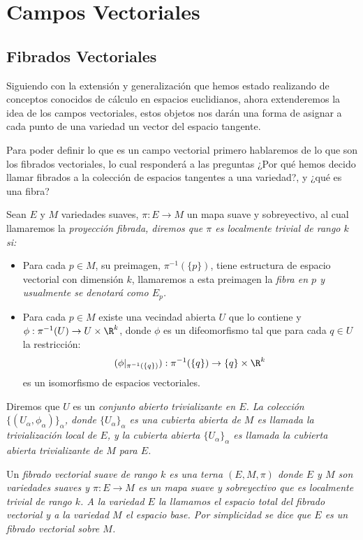 \section{Campos Vectoriales}\label{Sección: Campos Vectoriales}
\subsection{Fibrados Vectoriales}\label{Subsección: Fibrados Vectoriales}
Siguiendo con la extensión y generalización que hemos estado realizando de conceptos conocidos de cálculo en espacios euclidianos, ahora extenderemos la idea de los campos vectoriales, estos objetos nos darán una forma de asignar a cada punto de una variedad un vector del espacio tangente.

Para poder definir lo que es un campo vectorial primero hablaremos de lo que son los fibrados vectoriales, lo cual responderá a las preguntas ¿Por qué hemos decido llamar fibrados a la colección de espacios tangentes a una variedad?, y ¿qué es una fibra?

\begin{definition}
	Sean $E$ y $M$ variedades suaves, $\pi: E \to M$ un mapa suave y sobreyectivo, al cual llamaremos la \it{proyección fibrada}, diremos que $\pi$ es \it{localmente trivial de rango $k$} si:

	\begin{itemize}
		\item Para cada $p \in M$, su preimagen, $\pi^{-1}(\{p\})$, tiene estructura de espacio vectorial con dimensión $k$, llamaremos a esta preimagen la \it{fibra en $p$} y usualmente se denotará como $E_p$.

		\item Para cada $p \in M$ existe una vecindad abierta $U$ que lo contiene y $\phi: \pi^{-1}(U) \to U \times \R^{k}$, donde $\phi$ es un difeomorfismo tal que para cada $q \in U$ la restricción:
      \[ (\phi|_{\pi^{-1}(\{q\})}): \pi^{-1}(\{q\}) \to \{q\} \times \R^{k} \]
		      es un isomorfismo de espacios vectoriales.
	\end{itemize}

	Diremos que $U$ es un \it{conjunto abierto trivializante} en $E$. La colección $\{(U_\alpha, \phi_\alpha)\}_{\alpha}$, donde $\{U_{\alpha}\}_{\alpha}$ es una cubierta abierta de $M$ es llamada la trivialización local de $E$, y la cubierta abierta $\{U_\alpha\}_{\alpha}$ es llamada la cubierta abierta trivializante de $M$ para $E$.

  Un \it{fibrado vectorial suave de rango $k$} es una terna $(E,M,\pi)$ donde $E$ y $M$ son variedades suaves y $\pi: E \to M$ es un mapa suave y sobreyectivo que es localmente trivial de rango $k$. A la variedad $E$ la llamamos el \it{espacio total} del fibrado vectorial y a la variedad $M$ el \it{espacio base}. Por simplicidad se dice que \it{$E$ es un fibrado vectorial sobre $M$}.
\end{definition}

